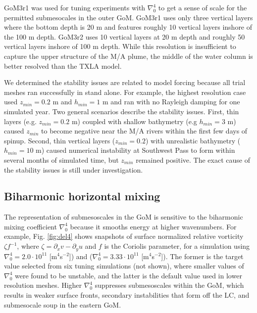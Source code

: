 GoM3r1 was used for tuning experiments with $\nabla_0^4$ to get a sense of scale for the permitted submesocales in the outer GoM. GoM3r1 uses only three vertical layers where the bottom depth is 20 m and features roughly 10 vertical layers inshore of the 100 m depth. GoM3r2 uses 10 vertical layers at 20 m depth and roughly 50 vertical layers inshore of 100 m depth. While this resolution is insufficient to capture the upper structure of the M/A plume, the middle of the water column is better resolved than the TXLA model.

We determined the stability issues are related to model forcing because all trial meshes ran successfully in stand alone. For example, the highest resolution case used $z_{min} = 0.2$ m and $h_{min} = 1$ m and ran with no Rayleigh damping for one simulated year. Two general scenarios describe the stability issues. First, thin layers (e.g. $z_{min} = 0.2$ m) coupled with shallow bathymetry (e.g $h_{min}=3$ m) caused $z_{min}$ to become negative near the M/A rivers within the first few days of spinup. Second, thin vertical layers ($z_{min} = 0.2$) with unrealistic bathymetry ($h_{min}=10$ m) caused numerical instability at Southwest Pass to form within several months of simulated time, but $z_{min}$ remained positive. The exact cause of the stability issues is still under investigation. 

\subsection{Biharmonic horizontal mixing}
The representation of submesoscales in the GoM is sensitive to the biharmonic mixing coefficient $\nabla_0^4$ because it smooths energy at higher wavenumbers. For example, Fig. \ref{fig:del4} shows snapshots of surface normalized relative vorticity $\zeta f^{-1}$, where $\zeta = \partial_x v - \partial_y u$ and $f$ is the Coriolis parameter, for a simulation using $\nabla_0^4=2.0 \cdot 10^{11}$ [m$^4$s$^{-2}$]) and ($\nabla_0^4=3.33 \cdot 10^{11}$ [m$^4$s$^{-2}$]). The former is the target value selected from six tuning simulations (not shown), where smaller values of $\nabla_0^4$ were found to be unstable, and the latter is the default value used in lower resolution meshes. Higher $\nabla_0^4$ suppresses submesoscales within the GoM, which results in weaker surface fronts, secondary instabilities that form off the LC, and submesocale soup in the eastern GoM. 

